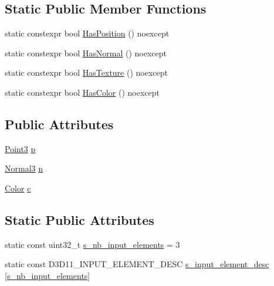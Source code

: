 \subsection*{Static Public Member Functions}
\begin{DoxyCompactItemize}
\item 
static constexpr bool \hyperlink{structmage_1_1_vertex_position_normal_color_ae5e4ff514524b532f8c148a2f7e2cf8d}{Has\+Position} () noexcept
\item 
static constexpr bool \hyperlink{structmage_1_1_vertex_position_normal_color_a89924fd28326ffbe05b3b096f713937d}{Has\+Normal} () noexcept
\item 
static constexpr bool \hyperlink{structmage_1_1_vertex_position_normal_color_a9939ce4300e6dd0402abd299f55435ef}{Has\+Texture} () noexcept
\item 
static constexpr bool \hyperlink{structmage_1_1_vertex_position_normal_color_ab59f21c8f7ae5cef563365fc9b7d34c7}{Has\+Color} () noexcept
\end{DoxyCompactItemize}
\subsection*{Public Attributes}
\begin{DoxyCompactItemize}
\item 
\hyperlink{structmage_1_1_point3}{Point3} \hyperlink{structmage_1_1_vertex_position_normal_color_a6847c367ca68fb8d8e349c8441ae63dd}{p}
\item 
\hyperlink{structmage_1_1_normal3}{Normal3} \hyperlink{structmage_1_1_vertex_position_normal_color_a771c7e71e8b6441b73f513f511507650}{n}
\item 
\hyperlink{structmage_1_1_color}{Color} \hyperlink{structmage_1_1_vertex_position_normal_color_a0d170b26a78b179330ae282ce97a036b}{c}
\end{DoxyCompactItemize}
\subsection*{Static Public Attributes}
\begin{DoxyCompactItemize}
\item 
static const uint32\+\_\+t \hyperlink{structmage_1_1_vertex_position_normal_color_ad0030350b1fea5b8383c8e904ca45d51}{s\+\_\+nb\+\_\+input\+\_\+elements} = 3
\item 
static const D3\+D11\+\_\+\+I\+N\+P\+U\+T\+\_\+\+E\+L\+E\+M\+E\+N\+T\+\_\+\+D\+E\+SC \hyperlink{structmage_1_1_vertex_position_normal_color_a1d14ae159608683093a33b38fb6259e4}{s\+\_\+input\+\_\+element\+\_\+desc} \mbox{[}\hyperlink{structmage_1_1_vertex_position_normal_color_ad0030350b1fea5b8383c8e904ca45d51}{s\+\_\+nb\+\_\+input\+\_\+elements}\mbox{]}
\end{DoxyCompactItemize}


